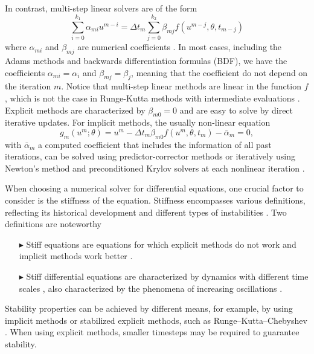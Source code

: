 In contrast, multi-step linear solvers are of the form 
\begin{equation}
    \sum_{i=0}^{k_1} \alpha_{mi} u^{m-i} 
    =
    \Delta t_m \sum_{j=0}^{k_2} \beta_{mj} f(u^{m-j}, \theta, t_{m-j})
\end{equation}
where $\alpha_{mi}$ and $\beta_{mj}$ are numerical coefficients \cite{hairer-solving-1}.
In most cases, including the Adams methods and backwards differentiation formulas (BDF), we have the coefficients $\alpha_{mi} = \alpha_i$ and $\beta_{mj}=\beta_j$, meaning that the coefficient do not depend on the iteration $m$. 
Notice that multi-step linear methods are linear in the function $f$, which is not the case in Runge-Kutta methods with intermediate evaluations \cite{ascher2008numerical}.
Explicit methods are characterized by $\beta_{m0} = 0$ and are easy to solve by direct iterative updates. 
For implicit methods, the usually non-linear equation 
\begin{equation}
    g_m(u^m; \theta) = u^m - \Delta t_m  \beta_{m0} f(u^m, \theta, t_m) - \bar{\alpha}_m = 0,
    \label{eq:solver-constriant-example}
\end{equation}
with $\bar{\alpha}_m$ a computed coefficient that includes the information of all past iterations, can be solved using predictor-corrector methods \cite{hairer-solving-1} or iteratively using Newton's method and preconditioned Krylov solvers at each nonlinear iteration \cite{SUNDIALS-hindmarsh2005sundials}.  

When choosing a numerical solver for differential equations, one crucial factor to consider is the stiffness of the equation.
Stiffness encompasses various definitions, reflecting its historical development and different types of instabilities \cite{Dahlquist_1985}.
Two definitions are noteworthy
\begin{enumerate}
    \item[$ \blacktriangleright$] Stiff equations are equations for which explicit methods do not work and implicit methods work better \cite{hairer-solving-2}.
    \item[$ \blacktriangleright$] Stiff differential equations are characterized by dynamics with different time scales \cite{hairer-solving-2, kim_stiff_2021}, also characterized by the phenomena of increasing oscillations \cite{Dahlquist_1985}.
\end{enumerate} 
Stability properties can be achieved by different means, for example, by using implicit methods or stabilized explicit methods, such as Runge–Kutta–Chebyshev \cite{van1980internal, hairer-solving-2}. 
When using explicit methods, smaller timesteps may be required to guarantee stability. 

